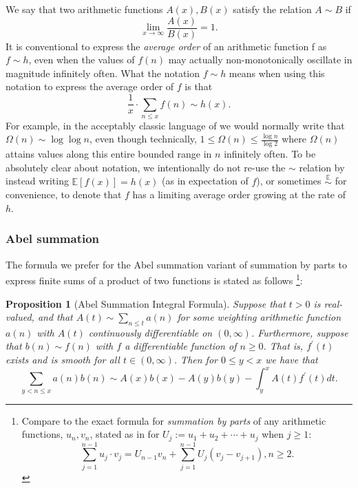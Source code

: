 \documentclass[11pt,reqno,a4letter]{article}
\numberwithin{figure}{section}
\numberwithin{table}{section}
\newcommand{\cf}{\textit{cf.\ }}
\theoremstyle{plain}
\newtheorem{prop}[theorem]{Proposition}
\numberwithin{theorem}{section}
\theoremstyle{definition}
\begin{document}
We say that two arithmetic functions $A(x), B(x)$ satisfy the relation $A \sim B$ if 
\[
\lim_{x \rightarrow \infty} \frac{A(x)}{B(x)} = 1. 
\] 
It is conventional to express the \emph{average order} of an arithmetic function f as 
$f \sim h$, even when the values of $f(n)$ may actually non-monotonically 
oscillate in magnitude infinitely often. What the notation $f \sim h$ means when using this 
notation to express the average order of $f$ is that 
$$\frac{1}{x} \cdot \sum_{n \leq x} f(n) \sim h(x).$$ 
For example, in the acceptably classic language of \cite{HARDYWRIGHT} we would normally write that 
$\Omega(n) \sim \log\log n$, even though technically, 
$1 \leq \Omega(n) \leq \frac{\log n}{\log 2}$ where $\Omega(n)$ attains values along this entire bounded 
range in $n$ infinitely often. 
To be absolutely clear about notation, we intentionally do not re-use the $\sim$ relation by 
instead writing $\mathbb{E}[f(x)] = h(x)$ (as in expectation of $f$), or sometimes 
$\overset{\mathbb{E}}{\sim}$ for convenience,  
to denote that $f$ has a limiting average order growing at the 
rate of $h$. 

\subsubsection{Abel summation} 

The formula we prefer for the Abel summation variant of summation by parts 
to express finite sums of a product of two functions is stated as follows 
\cite[\cf \S 4.3]{APOSTOLANUMT}\footnote{
     Compare to the exact formula for \emph{summation by parts} of any arithmetic functions, $u_n,v_n$, 
     stated as in \cite[\S 2.10(ii)]{NISTHB} for $U_j := u_1+u_2+\cdots+u_j$ when $j \geq 1$: 
     \[
     \sum_{j=1}^{n-1} u_j \cdot v_j = U_{n-1} v_n + \sum_{j=1}^{n-1} U_j \left(v_j - v_{j+1}\right), n \geq 2. 
     \]
}: 
 
\begin{prop}[Abel Summation Integral Formula] 
\label{prop_AbelSummationFormula} 
Suppose that $t > 0$ is real-valued, and that $A(t) \sim \sum_{n \leq t} a(n)$ for some weighting 
arithmetic function $a(n)$ with $A(t)$ continuously differentiable on $(0, \infty)$. Furthermore, suppose that 
$b(n) \sim f(n)$ with $f$ a differentiable function of $n \geq 0$. That is, $f^{\prime}(t)$ exists and is smooth for all 
$t \in (0, \infty)$. 
Then for $0 \leq y < x$ we have that 
\[
\sum_{y < n \leq x} a(n) b(n) \sim A(x)b(x) - A(y)b(y) - \int_y^{x} A(t) f^{\prime}(t) dt. 
\] 
\end{prop}
          
\end{document}
